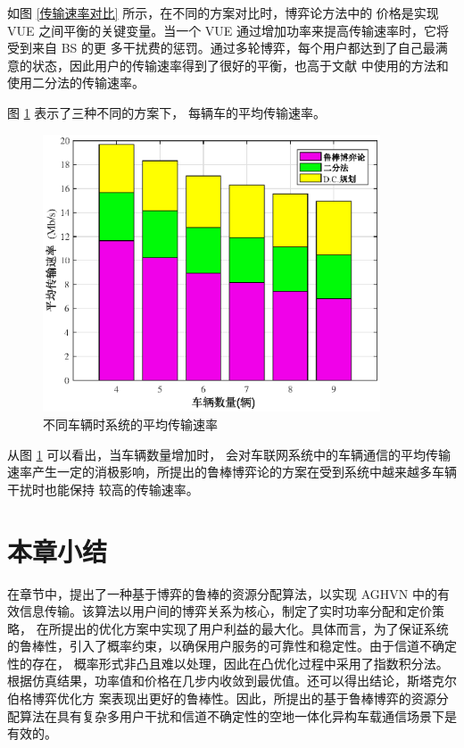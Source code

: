 如图 \ref{传输速率对比} 所示，在不同的方案对比时，博弈论方法中的
价格是实现 VUE 之间平衡的关键变量。当一个 VUE 通过增加功率来提高传输速率时，它将受到来自 BS 的更
多干扰费的惩罚。通过多轮博弈，每个用户都达到了自己最满意的状态，因此用户的传输速率得到了很好的平衡，也高于文献 \cite{PCID}中使用的方法和 使用二分法的传输速率。

图 \ref{不同车辆} 表示了三种不同的方案下，%
每辆车的平均传输速率。
\begin{figure}[H]
\centering
\includegraphics[width=10cm]{figures//chap2//不同车辆.eps}
\caption{不同车辆时系统的平均传输速率}
\label{不同车辆}
\end{figure}

从图 \ref{不同车辆} 可以看出，当车辆数量增加时，
会对车联网系统中的车辆通信的平均传输速率产生一定的消极影响，所提出的鲁棒博弈论的方案在受到系统中越来越多车辆干扰时也能保持
较高的传输速率。%
\section{本章小结}\label{section2-5}
在章节中，提出了一种基于博弈的鲁棒的资源分配算法，以实现 AGHVN 中的有效信息传输。该算法以用户间的博弈关系为核心，制定了实时功率分配和定价策略，
在所提出的优化方案中实现了用户利益的最大化。具体而言，为了保证系统的鲁棒性，引入了概率约束，以确保用户服务的可靠性和稳定性。由于信道不确定性的存在，
概率形式非凸且难以处理，因此在凸优化过程中采用了指数积分法。根据仿真结果，功率值和价格在几步内收敛到最优值。还可以得出结论，斯塔克尔伯格博弈优化方
案表现出更好的鲁棒性。因此，所提出的基于鲁棒博弈的资源分配算法在具有复杂多用户干扰和信道不确定性的空地一体化异构车载通信场景下是有效的。
























